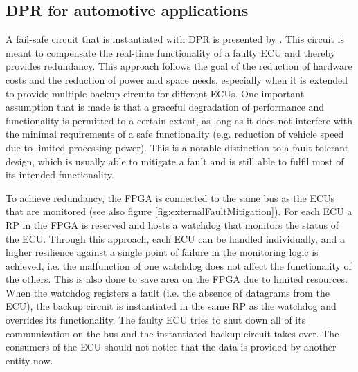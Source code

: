 \subsection{\gls{DPR} for automotive applications}
A fail-safe circuit that is instantiated with \gls{DPR} is presented by \cite{crdl_fail-safe_2002}. 
This circuit is meant to compensate the real-time functionality of a faulty \gls{ECU} and thereby provides redundancy.
This approach follows the goal of the reduction of hardware costs and the reduction of power and space needs, especially when it is extended to provide multiple backup circuits for different \glspl{ECU}.
One important assumption that is made is that a graceful degradation of performance and functionality is permitted to a certain extent, as long as it does not interfere with the minimal requirements of a safe functionality (e.g. reduction of vehicle speed due to limited processing power).
This is a notable distinction to a fault-tolerant design, which is usually able to mitigate a fault and is still able to fulfil most of its intended functionality.

To achieve redundancy, the \gls{FPGA} is connected to the same bus as the \glspl{ECU} that are monitored (see also figure \ref{fig:externalFaultMitigation}).
For each \gls{ECU} a \gls{RP} in the \gls{FPGA} is reserved and hosts a watchdog that monitors the status of the \gls{ECU}.
Through this approach, each \gls{ECU} can be handled individually, and a higher resilience against a single point of failure in the monitoring logic is achieved, i.e. the malfunction of one watchdog does not affect the functionality of the others.
This is also done to save area on the \gls{FPGA} due to limited resources.
When the watchdog registers a fault (i.e. the absence of datagrams from the \gls{ECU}), the backup circuit is instantiated in the same \gls{RP} as the watchdog and overrides its functionality.
The faulty \gls{ECU} tries to shut down all of its communication on the bus and the instantiated backup circuit takes over.
The consumers of the \gls{ECU} should not notice that the data is provided by another entity now.

